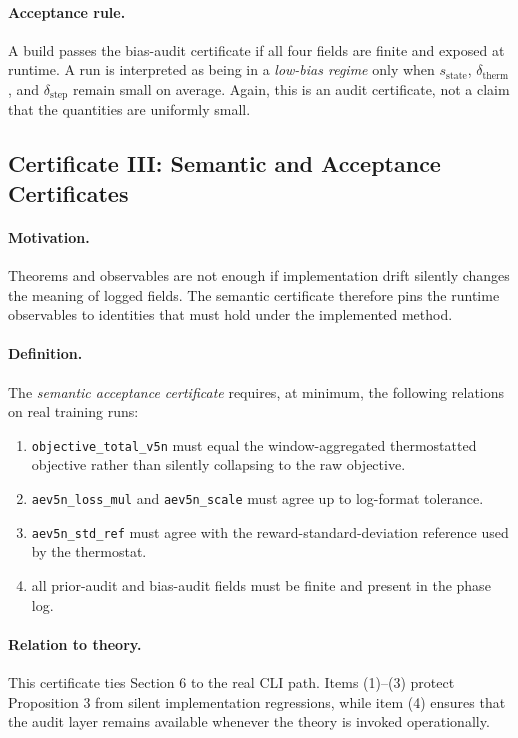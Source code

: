 \documentclass[11pt]{article}
\newcommand{\1}{\mathbf{1}}
\begin{document}
\paragraph{Acceptance rule.}
A build passes the bias-audit certificate if all four fields are finite and exposed at runtime. A run is interpreted as being in a \emph{low-bias regime} only when $s_{\mathrm{state}}$, $\delta_{\mathrm{therm}}$, and $\delta_{\mathrm{step}}$ remain small on average. Again, this is an audit certificate, not a claim that the quantities are uniformly small.

\subsection{Certificate III: Semantic and Acceptance Certificates}
\paragraph{Motivation.}
Theorems and observables are not enough if implementation drift silently changes the meaning of logged fields. The semantic certificate therefore pins the runtime observables to identities that must hold under the implemented method.

\paragraph{Definition.}
The \emph{semantic acceptance certificate} requires, at minimum, the following relations on real training runs:
\begin{enumerate}[label=\arabic*.]
  \item \texttt{objective\_total\_v5n} must equal the window-aggregated thermostatted objective rather than silently collapsing to the raw objective.
  \item \texttt{aev5n\_loss\_mul} and \texttt{aev5n\_scale} must agree up to log-format tolerance.
  \item \texttt{aev5n\_std\_ref} must agree with the reward-standard-deviation reference used by the thermostat.
  \item all prior-audit and bias-audit fields must be finite and present in the phase log.
\end{enumerate}

\paragraph{Relation to theory.}
This certificate ties Section 6 to the real CLI path. Items (1)--(3) protect Proposition 3 from silent implementation regressions, while item (4) ensures that the audit layer remains available whenever the theory is invoked operationally.
\end{document}
